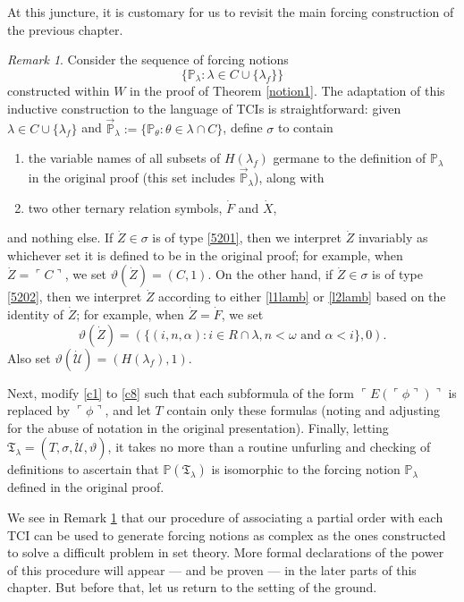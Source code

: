 \documentclass[12pt, twoside]{memoir}
\numberwithin{equation}{section}
\theoremstyle{definition}
\theoremstyle{remark}
\newtheorem{rem}[thm]{Remark}
\theoremstyle{definition}
\theoremstyle{definition}
\theoremstyle{definition}
\theoremstyle{remark}
\begin{document}
At this juncture, it is customary for us to revisit the main forcing construction of the previous chapter.

\begin{rem}\label{rem520}
Consider the sequence of forcing notions $$\{\mathbb{P}_{\lambda} : \lambda \in C \cup \{\lambda_f\}\}$$ constructed within $W$ in the proof of Theorem \ref{notion1}. The adaptation of this inductive construction to the language of TCIs is straightforward: given $\lambda \in C \cup \{\lambda_f\}$ and $\Vec{\mathbb{P}}_{\lambda} := \{\mathbb{P}_{\theta} : \theta \in \lambda \cap C\}$, define $\sigma$ to contain
\begin{enumerate}[label=(\Alph*)]
    \item\label{5201} the variable names of all subsets of $H(\lambda_f)$ germane to the definition of $\mathbb{P}_{\lambda}$ in the original proof (this set includes $\Vec{\mathbb{P}}_{\lambda}$), along with
    \item\label{5202} two other ternary relation symbols, $\dot{F}$ and $\dot{X}$,
\end{enumerate}
and nothing else. If $\dot{Z} \in \sigma$ is of type \ref{5201}, then we interpret $\dot{Z}$ invariably as whichever set it is defined to be in the original proof; for example, when $\dot{Z} = \ulcorner C \urcorner$, we set $\vartheta (\dot{Z}) = (C, 1)$. On the other hand, if $\dot{Z} \in \sigma$ is of type \ref{5202}, then we interpret $\dot{Z}$ according to either \ref{l1lamb} or \ref{l2lamb} based on the identity of $\dot{Z}$; for example, when $\dot{Z} = \dot{F}$,  we set $$\vartheta (\dot{Z}) = (\{(i, n, \alpha) : i \in R \cap \lambda, n < \omega \text{ and } \alpha < i\}, 0).$$ Also set $\vartheta (\dot{\mathcal{U}}) = (H(\lambda_f), 1)$. 

Next, modify \ref{c1} to \ref{c8} such that each subformula of the form $\ulcorner E(\ulcorner \phi \urcorner) \urcorner$ is replaced by $\ulcorner \phi \urcorner$, and let $T$ contain only these formulas (noting and adjusting for the abuse of notation in the original presentation). Finally, letting $\mathfrak{T}_{\lambda} = (T, \sigma, \dot{\mathcal{U}}, \vartheta)$, it takes no more than a routine unfurling and checking of definitions to ascertain that $\mathbb{P}(\mathfrak{T}_{\lambda})$ is isomorphic to the forcing notion $\mathbb{P}_{\lambda}$ defined in the original proof.
\end{rem}

We see in Remark \ref{rem520} that our procedure of associating a partial order with each TCI can be used to generate forcing notions as complex as the ones constructed to solve a difficult problem in set theory. More formal declarations of the power of this procedure will appear --- and be proven --- in the later parts of this chapter. But before that, let us return to the setting of the ground.
\end{document}
